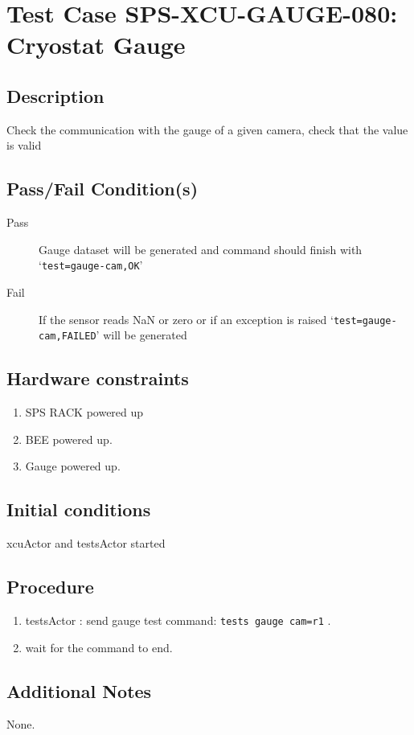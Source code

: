 \section{Test Case SPS-XCU-GAUGE-080: Cryostat Gauge}

\subsection{Description}

Check the communication with the gauge of a given camera, check that the value is valid

\subsection{Pass/Fail Condition(s)}

\begin{description}
\item [Pass] Gauge dataset will be generated and command should finish with `\texttt{test=gauge-cam,OK}'
\item [Fail] If the sensor reads NaN or zero or if an exception is raised `\texttt{test=gauge-cam,FAILED}' will be generated

\end{description}

\subsection{Hardware constraints}

\begin{enumerate}
    \item SPS RACK powered up
    \item \acrshort{BEE} powered up.
    \item Gauge powered up.
\end{enumerate}

\subsection{Initial conditions}

xcuActor and testsActor started

\subsection{Procedure}

\begin{enumerate}
    \item testsActor : send gauge test command: \texttt{tests gauge cam=r1} .
    \item wait for the command to end.
\end{enumerate}

\subsection{Additional Notes}
None.
